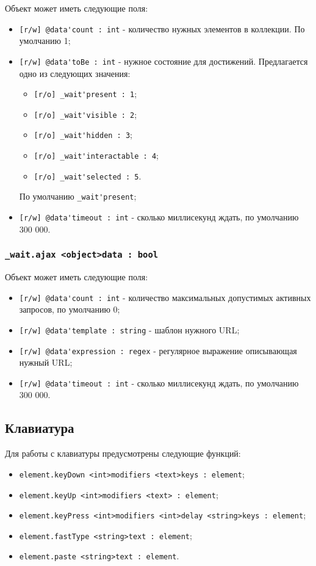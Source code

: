 \documentclass[a4paper, 14pt]{extarticle}
\newenvironment{icItems}
	{ \begin{itemize} [noitemsep,nolistsep] }
	{ \end{itemize} }
\begin{document}
Объект  может иметь следующие поля:
\begin{icItems}
	\item \lstinline|[r/w] @data'count : int| - количество нужных элементов в коллекции. По умолчанию 1;
	\item \lstinline|[r/w] @data'toBe : int| - нужное состояние для достижений. Предлагается одно из следующих значения:
	\begin{icItems}
		\item \lstinline|[r/o] _wait'present : 1|;
		\item \lstinline|[r/o] _wait'visible : 2|;
		\item \lstinline|[r/o] _wait'hidden : 3|;
		\item \lstinline|[r/o] _wait'interactable : 4|;
		\item \lstinline|[r/o] _wait'selected : 5|.
	\end{icItems}
	По умолчанию \lstinline|_wait'present|;
	\item \lstinline|[r/w] @data'timeout : int| - сколько миллисекунд ждать, по умолчанию 300 000.
\end{icItems}

\subsubsection{\lstinline|_wait.ajax <object>data : bool|}

Объект  может иметь следующие поля:
\begin{icItems}
	\item \lstinline|[r/w] @data'count : int| - количество максимальных допустимых активных запросов, по умолчанию 0;
	\item \lstinline|[r/w] @data'template : string| - шаблон нужного URL;
	\item \lstinline|[r/w] @data'expression : regex| - регулярное выражение описывающая нужный URL;
	\item \lstinline|[r/w] @data'timeout : int| - сколько миллисекунд ждать, по умолчанию 300 000.
\end{icItems}

\subsection{Клавиатура}

Для работы с клавиатуры предусмотрены следующие функций:
\begin{icItems}
	\item \lstinline|element.keyDown <int>modifiers <text>keys : element|;
	\item \lstinline|element.keyUp <int>modifiers <text> : element|;
	\item \lstinline|element.keyPress <int>modifiers <int>delay <string>keys : element|;
	\item \lstinline|element.fastType <string>text : element|;
	\item \lstinline|element.paste <string>text : element|.
\end{icItems}
\end{document}
